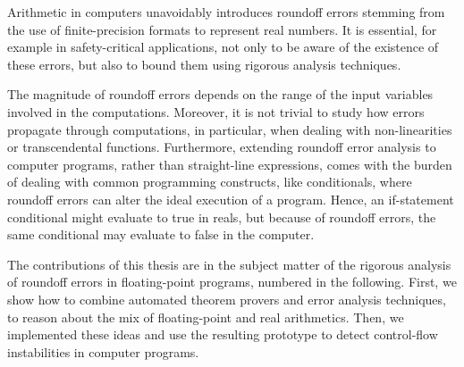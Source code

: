 %

Arithmetic in computers unavoidably introduces roundoff errors stemming from the use of finite-precision formats to represent real numbers.
%
It is essential, for example in safety-critical applications, not only to be aware of the existence of these errors, but also to bound them using rigorous analysis techniques.
%
%

%
The magnitude of roundoff errors depends on the range of the input variables involved in the computations.
%
Moreover, it is not trivial to study how errors propagate through computations, in particular, when dealing with non-linearities or transcendental functions.
%
Furthermore, extending roundoff error analysis to computer programs, rather than straight-line expressions, comes with the burden of dealing with common programming constructs, like conditionals, where roundoff errors can alter the ideal execution of a program. 
%
Hence, an if-statement conditional might evaluate to true in reals, but because of roundoff errors, the same conditional may evaluate to false in the computer. 
%
%
%
%
%

The contributions of this thesis are in the subject matter of the rigorous analysis of roundoff errors in floating-point programs, numbered in the following.
%
First, we show how to combine automated theorem provers and error analysis techniques, to reason about the mix of floating-point and real arithmetics.
%
Then, we implemented these ideas and use the resulting prototype to detect control-flow instabilities in computer programs.
%


